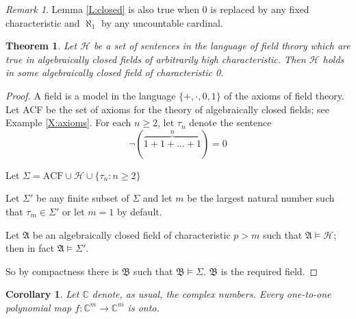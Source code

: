 \documentclass[titlepage, oneside]{amsbook}
\theoremstyle{plain}
\newtheorem{theorem}{Theorem}
\newtheorem{corollary}{Corollary}
\theoremstyle{definition}
\theoremstyle{remark}
\newtheorem*{rem}{Remark}
\begin{document}
\begin{rem}  Lemma \ref{L:closed} is also true when $0$ is replaced by
any
fixed characteristic and $\aleph_1$ by any uncountable cardinal.
\end{rem}



\begin{theorem}\label{T:fields} Let $\mathcal H$ be a set of sentences in
the 
language of 
field theory which are true in algebraically closed fields of 
arbitrarily high characteristic. Then $\mathcal H$ holds in some
algebraically closed field of characteristic 0.
\end{theorem}
\begin{proof} A field is a model in the language $\{ + , \cdot , 0 , 
1 \} $ of the axioms of field theory. Let ACF be the set of 
axioms for
 the theory of algebraically closed fields; see Example \ref{X:axioms}.
For each
$n \geq 2$, let 
$\tau_{n}$ denote the sentence \[ \neg (\overbrace{1+1+\dots+1}^{n}) 
= 0 \]

Let $\Sigma = \mbox{ACF} \cup \mathcal H \cup \{ \tau_{n} : n\geq 2 \}$

Let $\Sigma'$ be any finite subset of $\Sigma$ and let $m$ be the
largest 
natural number such that $\tau_{m} \in \Sigma'$ or let $m=1$ by default.

Let $\mathfrak{A}$ be an algebraically closed field of characteristic $p 
> m$ such that $\mathfrak{A} \models \mathcal H$; then in fact
$\mathfrak{A} 
\models \Sigma'$. 

So by compactness there is $\mathfrak{B}$ such that $\mathfrak{B} \models 
\Sigma$. $\mathfrak{B}$ is the required field.

\end{proof}  \begin{corollary}\label{C:ACF} Let $\mathbb{C}$
denote, as usual, the complex numbers.  Every one-to-one polynomial map
$f:\mathbb{C}^{m} \to \mathbb{C}^{m}$ is onto.  \end{corollary}
\end{document}
